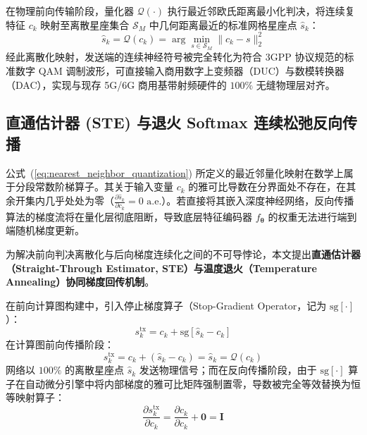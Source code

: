 在物理前向传输阶段，量化器 $\mathcal{Q}(\cdot)$ 执行最近邻欧氏距离最小化判决，将连续复特征 $c_k$ 映射至离散星座集合 $\mathcal{S}_M$ 中几何距离最近的标准网格星座点 $\hat{s}_k$：
\begin{equation}
  \hat{s}_k = \mathcal{Q}(c_k) = \arg\min_{s \in \mathcal{S}_M} \|c_k - s\|_2^2
  \label{eq:nearest_neighbor_quantization}
\end{equation}
经此离散化映射，发送端的连续神经符号被完全转化为符合 3GPP 协议规范的标准数字 QAM 调制波形，可直接输入商用数字上变频器（DUC）与数模转换器（DAC），实现与现存 5G/6G 商用基带射频硬件的 $100\%$ 无缝物理层对齐。

\subsection{直通估计器 (STE) 与退火 Softmax 连续松弛反向传播}
公式~(\ref{eq:nearest_neighbor_quantization}) 所定义的最近邻量化映射在数学上属于分段常数阶梯算子。其关于输入变量 $c_k$ 的雅可比导数在分界面处不存在，在其余开集内几乎处处为零（$\frac{\partial \hat{s}_k}{\partial c_k} = 0 \text{ a.e.}$）。若直接将其嵌入深度神经网络，反向传播算法的梯度流将在量化层彻底阻断，导致底层特征编码器 $f_{\bm{\theta}}$ 的权重无法进行端到端随机梯度更新。

为解决前向判决离散化与后向梯度连续化之间的不可导悖论，本文提出\textbf{直通估计器（Straight-Through Estimator, STE）与温度退火（Temperature Annealing）协同梯度回传机制}。

在前向计算图构建中，引入停止梯度算子（Stop-Gradient Operator，记为 $\text{sg}[\cdot]$）：
\begin{equation}
  s_k^{\text{tx}} = c_k + \text{sg}[\hat{s}_k - c_k]
  \label{eq:ste_forward_formulation}
\end{equation}
在计算图前向传播阶段：
\begin{equation}
  s_k^{\text{tx}} = c_k + (\hat{s}_k - c_k) = \hat{s}_k = \mathcal{Q}(c_k)
\end{equation}
网络以 $100\%$ 的离散星座点 $\hat{s}_k$ 发送物理信号；而在反向传播阶段，由于 $\text{sg}[\cdot]$ 算子在自动微分引擎中将内部梯度的雅可比矩阵强制置零，导数被完全等效替换为恒等映射算子：
\begin{equation}
  \frac{\partial s_k^{\text{tx}}}{\partial c_k} = \frac{\partial c_k}{\partial c_k} + \mathbf{0} = \bm{I}
  \label{eq:ste_backward_identity}
\end{equation}

